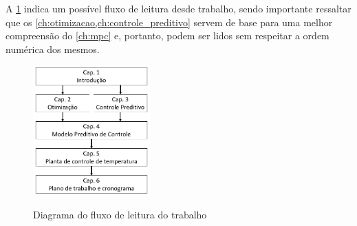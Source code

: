 A \cref{fig:estrutura_do_trabalho} indica um possível fluxo de leitura desde trabalho, sendo importante
ressaltar que os \cref{ch:otimizacao,ch:controle_preditivo} servem de base para uma melhor
compreensão do \cref{ch:mpc} e, portanto, podem ser lidos sem respeitar a ordem numérica dos mesmos.

\begin{figure}[h]
    \caption{Diagrama do fluxo de leitura do trabalho}
    \begin{center}
		\includegraphics[width=0.4\textwidth]{./5_images/fig_estrutura_do_trabalho.png} 
		\label{fig:estrutura_do_trabalho}
    \end{center}
    \centering
\end{figure}
